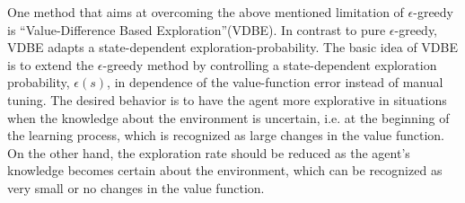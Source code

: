 One method that aims at overcoming the above mentioned limitation of $\epsilon$-greedy is ``Value-Difference Based Exploration''(VDBE)\cite{tokic2010adaptive}. In contrast to pure $\epsilon$-greedy, VDBE adapts a state-dependent exploration-probability. The basic idea of VDBE is to extend the $\epsilon$-greedy method by controlling a state-dependent exploration probability, $\epsilon(s)$, in dependence of the value-function error instead of manual tuning. The desired behavior is to have the agent more explorative in situations when the knowledge about the environment is uncertain, i.e. at the beginning of the learning process, which is recognized as large changes in the value function. On the other hand, the exploration rate should be reduced as the agent's knowledge becomes certain about the environment, which can be recognized as very small or no changes in the value function. 